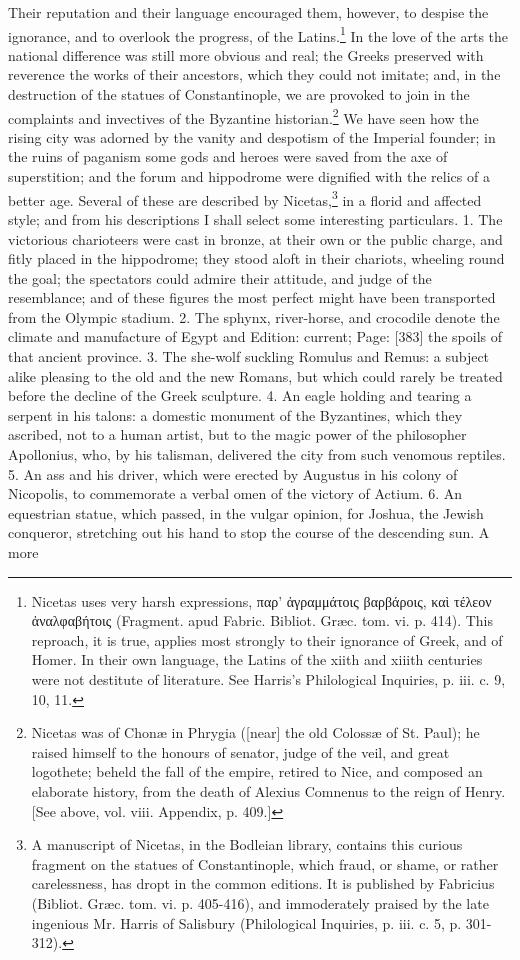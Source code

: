 Their reputation and their language encouraged them, however, to despise the ignorance, and to overlook the progress, of the Latins.\footnote{Nicetas uses very harsh expressions, \textgreek{παρ\texthebrew{’ ἀ}γραμμάτοις βαρβάροις, κα\texthebrew{ὶ} τέλεον \texthebrew{ἀ}ναλφαβήτοις} (Fragment. apud Fabric. Bibliot. Græc. tom. vi. p. 414). This reproach, it is true, applies most strongly to their ignorance of Greek, and of Homer. In their own language, the Latins of the xiith and xiiith centuries were not destitute of literature. See Harris\texthebrew{}’s Philological Inquiries, p. iii. c. 9, 10, 11.} In the love of the arts the national difference was still more obvious and real; the Greeks preserved with reverence the works of their ancestors, which they could not imitate; and, in the destruction of the statues of Constantinople, we are provoked to join in the complaints and invectives of the Byzantine historian.\footnote{Nicetas was of Chonæ in Phrygia ([near] the old Colossæ of St. Paul); he raised himself to the honours of senator, judge of the veil, and great logothete; beheld the fall of the empire, retired to Nice, and composed an elaborate history, from the death of Alexius Comnenus to the reign of Henry. [See above, vol. viii. Appendix, p. 409.]} We have seen how the rising city was adorned by the vanity and despotism of the Imperial founder; in the ruins of paganism some gods and heroes were saved from the axe of superstition; and the forum and hippodrome were dignified with the relics of a better age. Several of these are described by Nicetas,\footnote{A manuscript of Nicetas, in the Bodleian library, contains this curious fragment on the statues of Constantinople, which fraud, or shame, or rather carelessness, has dropt in the common editions. It is published by Fabricius (Bibliot. Græc. tom. vi. p. 405-416), and immoderately praised by the late ingenious Mr. Harris of Salisbury (Philological Inquiries, p. iii. c. 5, p. 301-312).} in a florid and affected style; and from his descriptions I shall select some interesting particulars. 1. The victorious charioteers were cast in bronze, at their own or the public charge, and fitly placed in the hippodrome; they stood aloft in their chariots, wheeling round the goal; the spectators could admire their attitude, and judge of the resemblance; and of these figures the most perfect might have been transported from the Olympic stadium. 2. The sphynx, river-horse, and crocodile denote the climate and manufacture of Egypt and Edition: current; Page: [383] the spoils of that ancient province. 3. The she-wolf suckling Romulus and Remus: a subject alike pleasing to the old and the new Romans, but which could rarely be treated before the decline of the Greek sculpture. 4. An eagle holding and tearing a serpent in his talons: a domestic monument of the Byzantines, which they ascribed, not to a human artist, but to the magic power of the philosopher Apollonius, who, by his talisman, delivered the city from such venomous reptiles. 5. An ass and his driver, which were erected by Augustus in his colony of Nicopolis, to commemorate a verbal omen of the victory of Actium. 6. An equestrian statue, which passed, in the vulgar opinion, for Joshua, the Jewish conqueror, stretching out his hand to stop the course of the descending sun. A more 